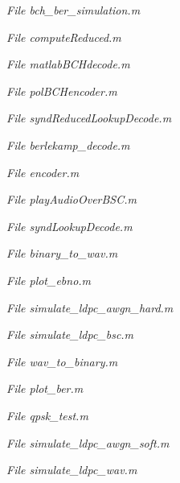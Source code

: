 \documentclass[a4paper]{article}
\begin{document}
\textit{File bch\_ber\_simulation.m} 

\textit{File computeReduced.m} 
 
\textit{File matlabBCHdecode.m} 
 
\textit{File polBCHencoder.m} 
 
\textit{File syndReducedLookupDecode.m} 

\textit{File berlekamp\_decode.m} 
 
\textit{File encoder.m} 
 
\textit{File playAudioOverBSC.m} 
 
\textit{File syndLookupDecode.m} 

\textit{File binary\_to\_wav.m} 

\textit{File plot\_ebno.m } 
 
\textit{File simulate\_ldpc\_awgn\_hard.m} 
 
\textit{File simulate\_ldpc\_bsc.m} 
 
\textit{File wav\_to\_binary.m} 

\textit{File plot\_ber.m } 
 
\textit{File qpsk\_test.m} 
 
\textit{File simulate\_ldpc\_awgn\_soft.m } 
 
\textit{File simulate\_ldpc\_wav.m} 

\end{document}
